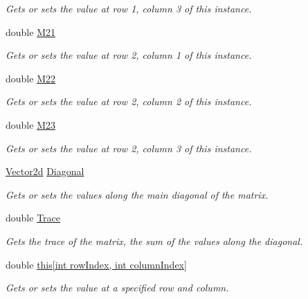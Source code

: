 \begin{DoxyCompactItemize}
\begin{DoxyCompactList}\small\item\em Gets or sets the value at row 1, column 3 of this instance. \end{DoxyCompactList}\item 
double \hyperlink{struct_open_t_k_1_1_matrix2x3d_a864d261be7349d8f3ea303a94eaeaa40}{M21}
\begin{DoxyCompactList}\small\item\em Gets or sets the value at row 2, column 1 of this instance. \end{DoxyCompactList}\item 
double \hyperlink{struct_open_t_k_1_1_matrix2x3d_ad91cdca908b35c96298bd2466a98d933}{M22}
\begin{DoxyCompactList}\small\item\em Gets or sets the value at row 2, column 2 of this instance. \end{DoxyCompactList}\item 
double \hyperlink{struct_open_t_k_1_1_matrix2x3d_abf5489b5128fbf75495c7c193ae7389b}{M23}
\begin{DoxyCompactList}\small\item\em Gets or sets the value at row 2, column 3 of this instance. \end{DoxyCompactList}\item 
\hyperlink{struct_open_t_k_1_1_vector2d}{Vector2d} \hyperlink{struct_open_t_k_1_1_matrix2x3d_a13f1b4a449dcaf4bdaeabd2930ce028e}{Diagonal}
\begin{DoxyCompactList}\small\item\em Gets or sets the values along the main diagonal of the matrix. \end{DoxyCompactList}\item 
double \hyperlink{struct_open_t_k_1_1_matrix2x3d_adaf315ae9d7e66491c9ed7f815fb0bfb}{Trace}
\begin{DoxyCompactList}\small\item\em Gets the trace of the matrix, the sum of the values along the diagonal. \end{DoxyCompactList}\item 
double \hyperlink{struct_open_t_k_1_1_matrix2x3d_a8a55bab941cec8eac958f95ce3d35448}{this\mbox{[}int row\-Index, int column\-Index\mbox{]}}
\begin{DoxyCompactList}\small\item\em Gets or sets the value at a specified row and column. \end{DoxyCompactList}\end{DoxyCompactItemize}


